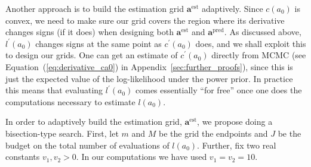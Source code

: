 \documentclass[a4paper, notitlepage, 11pt]{article}
\begin{document}
Another approach is to build the estimation grid $\boldsymbol a^{\text{est}}$ adaptively.
Since $c(a_0)$ is convex, we need to make sure our grid covers the region where its derivative changes signs (if it does) when designing both $\boldsymbol a^{\text{est}}$ and $\boldsymbol a^{\text{pred}}$.
As discussed above, $l^\prime(a_0)$ changes signs at the same point as $c^\prime(a_0)$ does, and we shall exploit this to design our grids.
One can get an estimate of $c^\prime(a_0)$ directly from MCMC (see Equation~(\ref{eq:derivative_ca0}) in Appendix~\ref{sec:further_proofs}), since this is just the expected value of the log-likelihood under the power prior.
In practice this means that evaluating $l^\prime(a_0)$ comes essentially ``for free'' once one does the computations necessary to estimate $l(a_0)$.

In order to adaptively build the estimation grid, $\boldsymbol a^{\text{est}}$, we propose doing a bisection-type search.
First, let $m$ and $M$ be the grid the endpoints and $J$ be the budget on the total number of evaluations of $l(a_0)$.
Further, fix two real constants $v_1, v_2 > 0$.
In our computations we have used $v_1 = v_2 =  10$. 
\end{document}
